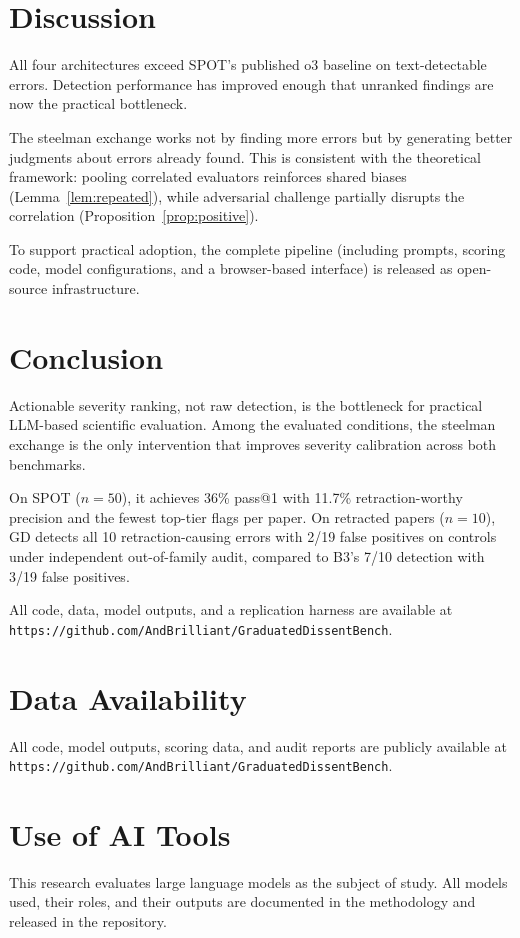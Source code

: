 \documentclass{ws-ijprai}
\begin{document}
\section{Discussion}

All four architectures exceed SPOT's published o3 baseline on text-detectable
errors. Detection performance has improved enough that unranked findings are
now the practical bottleneck.

The steelman exchange works not by finding more errors but by generating
better judgments about errors already found. This is consistent with the
theoretical framework: pooling correlated evaluators reinforces shared biases
(Lemma~\ref{lem:repeated}), while adversarial challenge partially disrupts
the correlation (Proposition~\ref{prop:positive}).

To support practical adoption, the complete pipeline (including prompts,
scoring code, model configurations, and a browser-based interface) is
released as open-source infrastructure.


\section{Conclusion}

Actionable severity ranking, not raw detection, is the bottleneck for
practical LLM-based scientific evaluation. Among the evaluated conditions,
the steelman exchange is the only intervention that improves severity
calibration across both benchmarks.

On SPOT ($n=50$), it achieves 36\% pass@1 with 11.7\% retraction-worthy
precision and the fewest top-tier flags per paper. On retracted papers
($n=10$), GD detects all 10 retraction-causing errors with 2/19 false
positives on controls under independent out-of-family audit, compared to
B3's 7/10 detection with 3/19 false positives.

All code, data, model outputs, and a replication harness are available at
\texttt{https://github.com/AndBrilliant/GraduatedDissentBench}.


\section*{Data Availability}
All code, model outputs, scoring data, and audit reports are publicly
available at \texttt{https://github.com/AndBrilliant/GraduatedDissentBench}.

\section*{Use of AI Tools}
This research evaluates large language models as the subject of study.
All models used, their roles, and their outputs are documented in the
methodology and released in the repository.
\end{document}
